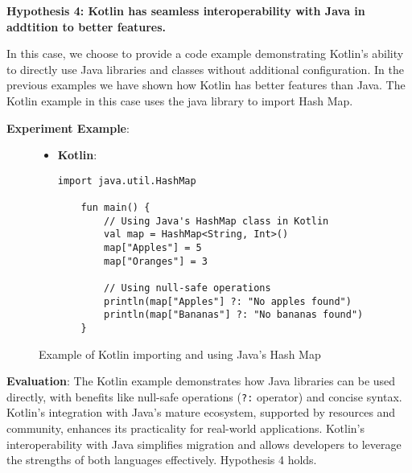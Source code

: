 \vspace{1em}


\noindent \textbf{Hypothesis 4: Kotlin has seamless interoperability with Java in addtition to better features.}

\vspace{1em}

\noindent In this case, we choose to provide a code example demonstrating Kotlin's ability to directly use Java libraries and classes without additional configuration. In the previous examples we have shown how Kotlin has better features than Java. The Kotlin example in this case uses the java library to import Hash Map.

\vspace{1em}

\noindent \textbf{Experiment Example}:

\begin{figure}[H]
\centering	
\begin{tcolorbox}[colframe=blue!80!black, colback=blue!5!white, coltitle=blue!50!black, title={-}, boxrule=0.5mm, width=0.8\textwidth, sharp corners=south]
    \begin{itemize}
        \item \textbf{\scriptsize Kotlin}:
        \begin{lstlisting}[style=kotlin, basicstyle=\scriptsize\ttfamily]
    import java.util.HashMap

    fun main() {
        // Using Java's HashMap class in Kotlin
        val map = HashMap<String, Int>()
        map["Apples"] = 5
        map["Oranges"] = 3

        // Using null-safe operations
        println(map["Apples"] ?: "No apples found")
        println(map["Bananas"] ?: "No bananas found")
    }
        \end{lstlisting}
    \end{itemize}
\end{tcolorbox}
\caption{Example of Kotlin importing and using Java's Hash Map}
\label{fig:import_hashmap}
\end{figure}

\vspace{1em}

\noindent \textbf{Evaluation}: The Kotlin example demonstrates how Java libraries can be used directly, with benefits like null-safe operations (\texttt{?:} operator) and concise syntax. Kotlin's integration with Java's mature ecosystem, supported by resources and community, enhances its practicality for real-world applications.  Kotlin’s interoperability with Java simplifies migration and allows developers to leverage the strengths of both languages effectively. Hypothesis 4 holds. 



